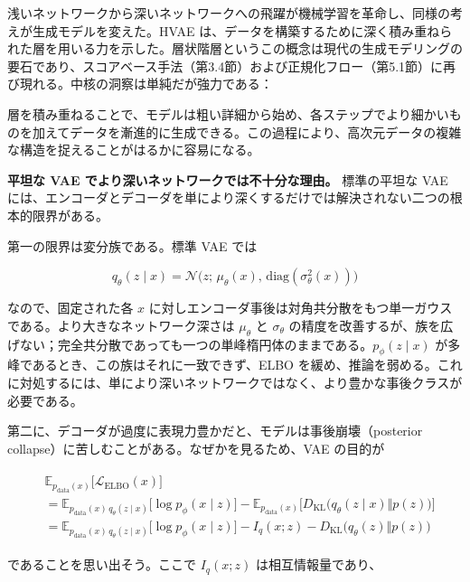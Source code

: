 浅いネットワークから深いネットワークへの飛躍が機械学習を革命し、同様の考えが生成モデルを変えた。HVAE は、データを構築するために深く積み重ねられた層を用いる力を示した。層状階層というこの概念は現代の生成モデリングの要石であり、スコアベース手法（第3.4節）および正規化フロー（第5.1節）に再び現れる。中核の洞察は単純だが強力である：

\begin{propositionbox}[観察 2.1.1:]
層を積み重ねることで、モデルは粗い詳細から始め、各ステップでより細かいものを加えてデータを漸進的に生成できる。この過程により、高次元データの複雑な構造を捉えることがはるかに容易になる。
\end{propositionbox}


\textbf{平坦な VAE でより深いネットワークでは不十分な理由。} 標準の平坦な VAE には、エンコーダとデコーダを単により深くするだけでは解決されない二つの根本的限界がある。

第一の限界は変分族である。標準 VAE では

\[
q_\theta(z\mid x) = \mathcal{N}\bigl(z;\, \mu_\theta(x),\, \mathrm{diag}(\sigma_\theta^2(x))\bigr)
\]


なので、固定された各 $x$ に対しエンコーダ事後は対角共分散をもつ単一ガウスである。より大きなネットワーク深さは $\mu_\theta$ と $\sigma_\theta$ の精度を改善するが、族を広げない；完全共分散であっても一つの単峰楕円体のままである。$p_\phi(z\mid x)$ が多峰であるとき、この族はそれに一致できず、ELBO を緩め、推論を弱める。これに対処するには、単により深いネットワークではなく、より豊かな事後クラスが必要である。

第二に、デコーダが過度に表現力豊かだと、モデルは事後崩壊（posterior collapse）に苦しむことがある。なぜかを見るため、VAE の目的が

\begin{align*}
\begin{aligned}
&\mathbb{E}_{p_{\mathrm{data}}(x)}\bigl[\mathcal{L}_{\mathrm{ELBO}}(x)\bigr] \\
&= \mathbb{E}_{p_{\mathrm{data}}(x)\, q_\theta(z\mid x)}\bigl[\log p_\phi(x\mid z)\bigr]
- \mathbb{E}_{p_{\mathrm{data}}(x)}\bigl[D_{\mathrm{KL}}\bigl(q_\theta(z\mid x)\Vert p(z)\bigr)\bigr] \\
&= \mathbb{E}_{p_{\mathrm{data}}(x)\, q_\theta(z\mid x)}\bigl[\log p_\phi(x\mid z)\bigr]
- I_q(x; z)
- D_{\mathrm{KL}}\bigl(q_\theta(z)\Vert p(z)\bigr)
\end{aligned}
\end{align*}


であることを思い出そう。ここで $I_q(x; z)$ は相互情報量であり、


